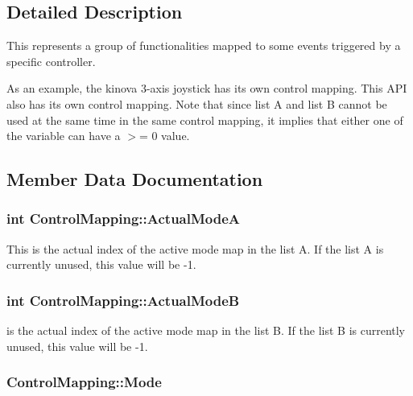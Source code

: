 \subsection{Detailed Description}
This represents a group of functionalities mapped to some events triggered by a specific controller. 

As an example, the kinova 3-\/axis joystick has its own control mapping. This A\+PI also has its own control mapping. Note that since list A and list B cannot be used at the same time in the same control mapping, it implies that either one of the variable can have a $>$= 0 value. 

\subsection{Member Data Documentation}
\subsubsection[{\texorpdfstring{Actual\+ModeA}{ActualModeA}}]{\setlength{\rightskip}{0pt plus 5cm}int Control\+Mapping\+::\+Actual\+ModeA}\hypertarget{struct_control_mapping_a12722cd1ab9c15c8fee5b6722d9f9f69}{}\label{struct_control_mapping_a12722cd1ab9c15c8fee5b6722d9f9f69}


This is the actual index of the active mode map in the list A. If the list A is currently unused, this value will be -\/1. 

\subsubsection[{\texorpdfstring{Actual\+ModeB}{ActualModeB}}]{\setlength{\rightskip}{0pt plus 5cm}int Control\+Mapping\+::\+Actual\+ModeB}\hypertarget{struct_control_mapping_a9c3fea40ada452fa35d9d12d003eb867}{}\label{struct_control_mapping_a9c3fea40ada452fa35d9d12d003eb867}
is the actual index of the active mode map in the list B. If the list B is currently unused, this value will be -\/1. 
\subsubsection[{\texorpdfstring{Mode}{Mode}}]{ Control\+Mapping\+::\+Mode}\hypertarget{struct_control_mapping_a293caba4b861368460f71e13fff5b523}{}\label{struct_control_mapping_a293caba4b861368460f71e13fff5b523}


